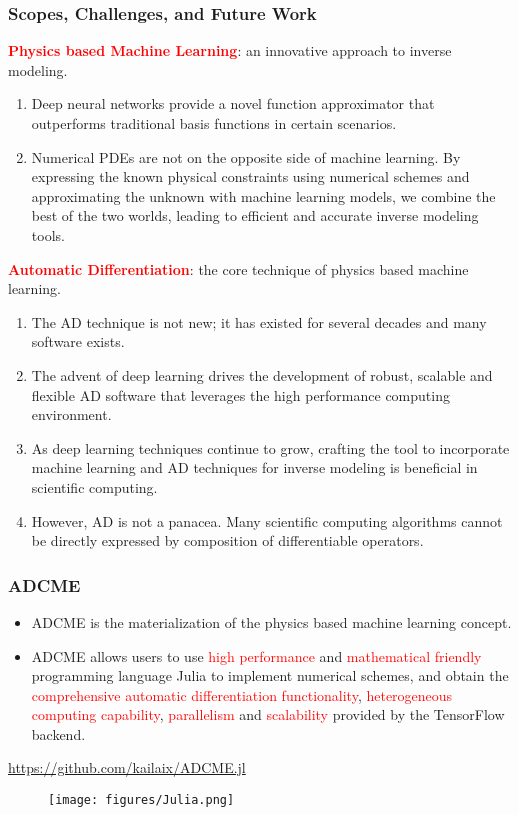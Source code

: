 \documentclass[usenames,dvipsnames]{beamer}
\begin{document}
\begin{frame}
	\frametitle{Scopes, Challenges, and Future Work}
	\textcolor{red}{\textbf{Physics based Machine Learning}}: an innovative approach to inverse modeling. 
	{\scriptsize
	\begin{enumerate}
		\item Deep neural networks provide a novel function approximator that outperforms traditional basis functions in certain scenarios. 
		\item Numerical PDEs are not on the opposite side of machine learning. By expressing the known physical constraints using numerical schemes and approximating the unknown with machine learning models, we combine the best of the two worlds, leading to efficient and accurate inverse modeling tools. 
	\end{enumerate}
	}
		
		\textcolor{red}{\textbf{Automatic Differentiation}}: the core technique of physics based machine learning.
		{\scriptsize
		\begin{enumerate}
		\item The AD technique is not new; it has existed for several decades and many software exists. 
		\item The advent of deep learning drives the development of robust, scalable and flexible AD software that leverages the high performance computing environment. 
		\item As deep learning techniques continue to grow, crafting the tool to incorporate machine learning and AD techniques for inverse modeling is beneficial in scientific computing.
		\item However, AD is not a panacea. Many scientific computing algorithms cannot be directly expressed by composition of differentiable operators. 
	\end{enumerate}
	}
	
\end{frame}

\begin{frame}
	\frametitle{ADCME}
	\begin{itemize}
	\item ADCME is the materialization of the physics based machine learning concept. 
		\item ADCME allows users to use \textcolor{red}{high performance} and \textcolor{red}{mathematical friendly} programming language Julia to implement numerical schemes, and obtain the \textcolor{red}{comprehensive automatic differentiation functionality}, \textcolor{red}{heterogeneous computing capability}, \textcolor{red}{parallelism} and \textcolor{red}{scalability} provided by the TensorFlow backend. 
	\end{itemize}
	\begin{center}
		\url{https://github.com/kailaix/ADCME.jl}
	\end{center}
	\vspace{-0.3cm}
	\begin{figure}[hbt]
  \texttt{[image: figures/Julia.png]}
\end{figure}
\end{frame}
\end{document}
